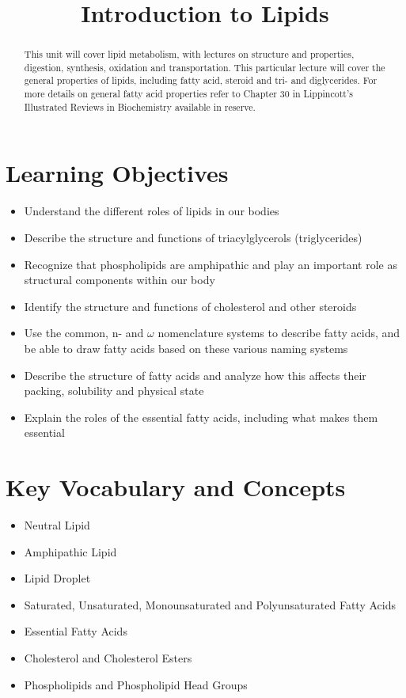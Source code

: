 \documentclass{tufte-handout}
\title{Introduction to Lipids}
\author{}
\date{}  %
\begin{document}
\maketitle%

\begin{abstract}
\noindent This unit will cover lipid metabolism, with lectures on structure and properties, digestion, synthesis, oxidation and transportation.  This particular lecture will cover the general properties of lipids, including fatty acid, steroid and tri- and diglycerides.  For more details on general fatty acid properties refer to Chapter 30 in Lippincott's Illustrated Reviews in Biochemistry available in reserve\cite{Ferrier2017}.
\end{abstract}

\tableofcontents

\pagebreak
\section{Learning Objectives}

\begin{itemize}
\item Understand the different roles of lipids in our bodies
\item Describe the structure and functions of triacylglycerols (triglycerides)
\item Recognize that phospholipids are amphipathic and play an important role as structural components within our body
\item Identify the structure and functions of cholesterol and other steroids
\item Use the common, n- and $\omega$ nomenclature systems to describe fatty acids, and be able to draw fatty acids based on these various naming systems
\item Describe the structure of fatty acids and analyze how this affects their packing, solubility and physical state
\item Explain the roles of the essential fatty acids, including what makes them essential

\end{itemize}

\section{Key Vocabulary and Concepts}

\begin{itemize}
\item Neutral Lipid
\item Amphipathic Lipid
\item Lipid Droplet
\item Saturated, Unsaturated, Monounsaturated and Polyunsaturated Fatty Acids
\item Essential Fatty Acids
\item Cholesterol and Cholesterol Esters
\item Phospholipids and Phospholipid Head Groups

\end{itemize}
\end{document}
